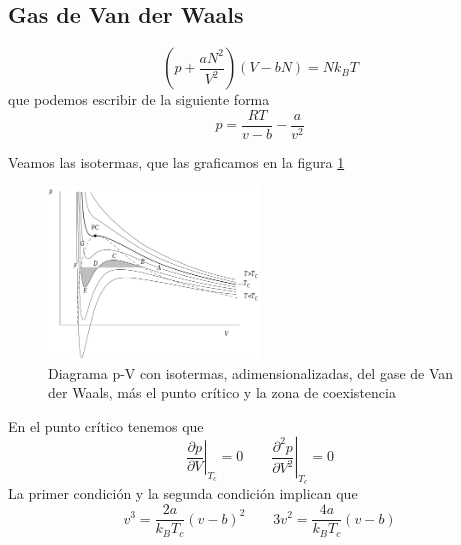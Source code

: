 \documentclass{book}
\numberwithin{equation}{section} %
\begin{document}
\subsection{Gas de Van der Waals}

\begin{equation}
    \left(p + \frac{a N^2}{V^2}\right)(V- b N) = N k_B T
    \label{eq:vanderwalls}
\end{equation}
que podemos escribir de la siguiente forma
\begin{equation}
    p = \frac{R T}{v - b} - \frac{a}{v^2}
    \label{eq:vanderwalls_intensivo}
\end{equation}

Veamos las isotermas, que las graficamos en la figura \ref{fig:gases_vdw_isotermas}
\begin{figure}[H]
    \centering
    \includegraphics[width=0.5\textwidth]{gases_vdw_isotermas}
    \caption{Diagrama p-V con isotermas, adimensionalizadas, del gase de Van der Waals, más el punto crítico y la zona de coexistencia}
    \label{fig:gases_vdw_isotermas}
\end{figure}


En el punto crítico tenemos que
\begin{equation}
    \left.\frac{\partial p}{\partial V}\right|_{T_c} = 0 \qquad \left.\frac{\partial^2 p}{\partial V^2}\right|_{T_c} = 0
\end{equation}
La primer condición y la segunda condición implican que
\begin{equation}
    v^3 = \frac{2 a}{k_B T_c} (v - b)^2 \qquad 3 v^2 = \frac{4 a}{k_B T_c} (v - b)
\end{equation}
\end{document}
